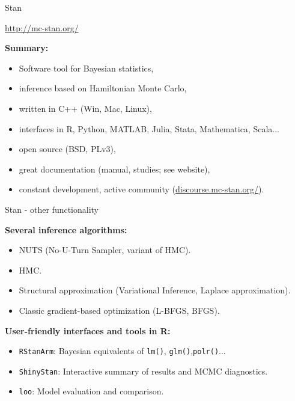 \begin{frame}{Stan}

\bigskip

\begin{center}\url{http://mc-stan.org/}\end{center}

\bigskip

\textbf{Summary:}

\begin{itemize}
\item Software tool for Bayesian statistics,
\item inference based on Hamiltonian Monte Carlo,
\item written in C++ (Win, Mac, Linux),
\item interfaces in R, Python, MATLAB, Julia, Stata, Mathematica, Scala...
\item open source (BSD, PLv3),
\item great documentation (manual, studies; see website),
\item constant development, active community (\url{discourse.mc-stan.org/}).
\end{itemize}

\bigskip

\end{frame}

\begin{frame}{Stan - other functionality}

\smallskip

\textbf{Several inference algorithms:}

\begin{itemize}
\item NUTS (No-U-Turn Sampler, variant of HMC). 
\item HMC.
\item Structural approximation (Variational Inference, Laplace approximation).
\item Classic gradient-based optimization (L-BFGS, BFGS).
\end{itemize}

\bigskip

\textbf{User-friendly interfaces and tools in R:}

\begin{itemize}
\item \texttt{RStanArm}: Bayesian equivalents of \texttt{lm()}, \texttt{glm()},\texttt{polr()}...
\item \texttt{ShinyStan}: Interactive summary of results and MCMC diagnostics.
\item \texttt{loo}: Model evaluation and comparison.
\end{itemize}


\end{frame}

